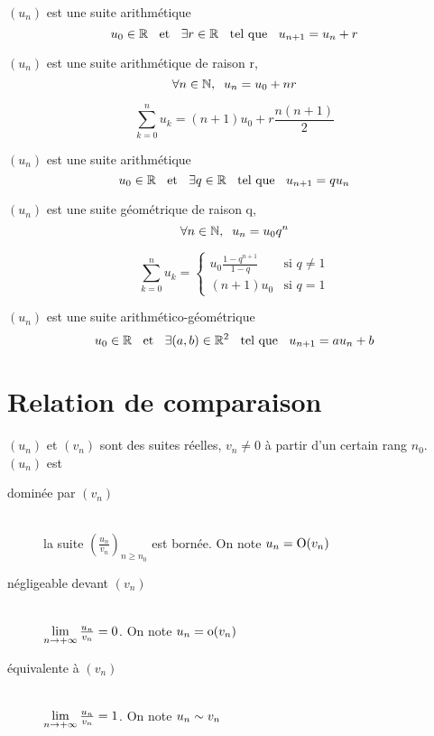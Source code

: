 \begin{dfn}
$(u_n)$ est une suite arithmétique \ssi
\[
    u_0 \in \mathbb{R} \;\;\text{ et }\;\; \exists r \in \mathbb{R} \;\;\text{ tel que }\;\; u_{n + 1} = u_n + r
\]
\end{dfn}

\begin{prp}
$(u_n)$ est une suite arithmétique de raison r,
\[
    \forall n \in \mathbb{N}, \;\; u_n = u_0 + n r
\]
\end{prp}

\begin{prp}
\[
    \sum_{k = 0}^{n} u_k = (n + 1) u_0 + r \frac{n (n + 1)}{2}
\]
\end{prp}

\begin{dfn}
$(u_n)$ est une suite arithmétique \ssi
\[
    u_0 \in \mathbb{R} \;\;\text{ et }\;\; \exists q \in \mathbb{R} \;\;\text{ tel que }\;\; u_{n + 1} = q u_n
\]
\end{dfn}

\begin{prp}
$(u_n)$ est une suite géométrique de raison q,
\[
    \forall n \in \mathbb{N}, \;\; u_n = u_0 q^n
\]
\end{prp}

\begin{prp}
\[
    \sum_{k = 0}^{n} u_k = 
    \begin{cases}
        u_0 \frac{1 - q^{n + 1}}{1 - q} &\text{si } q \neq 1 \\
        (n + 1) u_0                     &\text{si } q = 1
    \end{cases}
\]
\end{prp}

\begin{dfn}
$(u_n)$ est une suite arithmético-géométrique \ssi
\[
    u_0 \in \mathbb{R} \;\;\text{ et }\;\; \exists (a, b) \in \mathbb{R}^2 \;\;\text{ tel que }\;\; u_{n + 1} = a u_n + b
\]
\end{dfn}


\section{Relation de comparaison}

\begin{dfn}
$(u_n)$ et $(v_n)$ sont des suites réelles, $v_n \neq 0$ à partir d'un
certain rang $n_0$. \\
$(u_n)$ est
\begin{description}
    \item[dominée par $(v_n)$] \quad \\
    \ssi la suite $\left(\frac{u_n}{v_n}\right)_{n \geq n_0}$ est bornée.
    On note $u_n = \operatorname*{O}(v_n)$
    \item[négligeable devant $(v_n)$] \quad \\
    \ssi $\lim\limits_{n \to +\infty} \frac{u_n}{v_n} = 0$.
    On note $u_n = \operatorname*{o}(v_n)$
    \item[équivalente à $(v_n)$] \quad \\
    \ssi $\lim\limits_{n \to +\infty} \frac{u_n}{v_n} = 1$.
    On note $u_n \underset{}{\sim} v_n$
\end{description}
\end{dfn}

